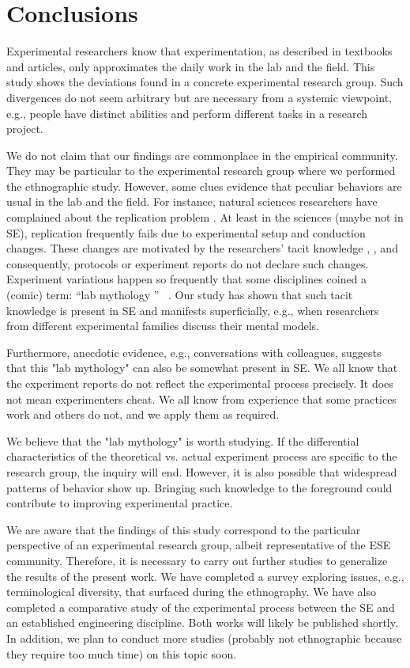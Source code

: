 \section{Conclusions}\label{sec-conclusions}
Experimental researchers know that experimentation, as described in textbooks and articles, only approximates the daily work in the lab and the field. This study shows the deviations found in a concrete experimental research group. Such divergences do not seem arbitrary but are necessary from a systemic viewpoint, e.g., people have distinct abilities and perform different tasks in a research project.

We do not claim that our findings are commonplace in the empirical community. They may be particular to the experimental research group where we performed the ethnographic study. However, some clues evidence that peculiar behaviors are usual in the lab and the field. For instance, natural sciences researchers have complained about the replication problem \cite{hines2014sorting}. At least in the sciences (maybe not in SE), replication frequently fails due to experimental setup and conduction changes. These changes are motivated by the researchers' tacit knowledge \cite{Polanyi-1996-tacit-k}, \cite{Shull-2002-replicating-SE-experiments-tacit-k}, and consequently, protocols or experiment reports do not declare such changes. Experiment variations happen so frequently that some disciplines coined a (comic) term: \textquotedblleft lab mythology \textquotedblright~\cite{ruben2011experimental} \cite{loukides2015beyond}. Our study has shown that such tacit knowledge is present in SE and manifests superficially, e.g., when researchers from different experimental families discuss their mental models.

Furthermore, anecdotic evidence, e.g., conversations with colleagues, suggests that this "lab mythology" can also be somewhat present in SE. We all know that the experiment reports do not reflect the experimental process precisely. It does not mean experimenters cheat. We all know from experience that some practices work and others do not, and we apply them as required.

We believe that the "lab mythology" is worth studying. If the differential characteristics of the theoretical vs. actual experiment process are specific to the research group, the inquiry will end. However, it is also possible that widespread patterns of behavior show up. Bringing such knowledge to the foreground could contribute to improving experimental practice.

We are aware that the findings of this study correspond to the particular perspective of an experimental research group, albeit representative of the ESE community. Therefore, it is necessary to carry out further studies to generalize the results of the present work. We have completed a survey exploring issues, e.g., terminological diversity, that surfaced during the ethnography. We have also completed a comparative study of the experimental process between the SE and an established engineering discipline. Both works will likely be published shortly. In addition, we plan to conduct more studies (probably not ethnographic because they require too much time) on this topic soon.